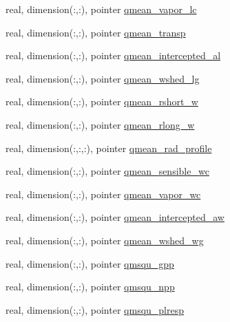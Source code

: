 \begin{DoxyCompactItemize}
\item 
real, dimension(\+:,\+:), pointer \hyperlink{structed__state__vars_1_1patchtype_aed7445225a77f628c746cac281507a53}{qmean\+\_\+vapor\+\_\+lc}
\item 
real, dimension(\+:,\+:), pointer \hyperlink{structed__state__vars_1_1patchtype_a08105f234acc20638a4196fe72eb3c0b}{qmean\+\_\+transp}
\item 
real, dimension(\+:,\+:), pointer \hyperlink{structed__state__vars_1_1patchtype_a09f85fa1f73e11a63f83bfb52613053a}{qmean\+\_\+intercepted\+\_\+al}
\item 
real, dimension(\+:,\+:), pointer \hyperlink{structed__state__vars_1_1patchtype_ae1c9098bcb22f10a5fce878ab55a1cf3}{qmean\+\_\+wshed\+\_\+lg}
\item 
real, dimension(\+:,\+:), pointer \hyperlink{structed__state__vars_1_1patchtype_aa44a19c9e383a58d002113eb433fd1ae}{qmean\+\_\+rshort\+\_\+w}
\item 
real, dimension(\+:,\+:), pointer \hyperlink{structed__state__vars_1_1patchtype_a10bc9e3763e29019eb291f2f2cf508dd}{qmean\+\_\+rlong\+\_\+w}
\item 
real, dimension(\+:,\+:,\+:), pointer \hyperlink{structed__state__vars_1_1patchtype_a813b69b555801d99b6e7301d997589f4}{qmean\+\_\+rad\+\_\+profile}
\item 
real, dimension(\+:,\+:), pointer \hyperlink{structed__state__vars_1_1patchtype_aa43a35ed2d968d3f325b9bc66dafb7b3}{qmean\+\_\+sensible\+\_\+wc}
\item 
real, dimension(\+:,\+:), pointer \hyperlink{structed__state__vars_1_1patchtype_a88624e5b5214d970b07c8bcbe15ac7e6}{qmean\+\_\+vapor\+\_\+wc}
\item 
real, dimension(\+:,\+:), pointer \hyperlink{structed__state__vars_1_1patchtype_aaf30eb5f3c6f6e40550f515bd9bc1f19}{qmean\+\_\+intercepted\+\_\+aw}
\item 
real, dimension(\+:,\+:), pointer \hyperlink{structed__state__vars_1_1patchtype_ad152cf377bbfd96af019c0e71a79f97a}{qmean\+\_\+wshed\+\_\+wg}
\item 
real, dimension(\+:,\+:), pointer \hyperlink{structed__state__vars_1_1patchtype_a0f45aab0f1cc4f750a92c8c4a470ae6a}{qmsqu\+\_\+gpp}
\item 
real, dimension(\+:,\+:), pointer \hyperlink{structed__state__vars_1_1patchtype_a351ffb065e425ce16c87fde635217532}{qmsqu\+\_\+npp}
\item 
real, dimension(\+:,\+:), pointer \hyperlink{structed__state__vars_1_1patchtype_aadc08badc00cc983fb3127f2ffa0aaf6}{qmsqu\+\_\+plresp}

\end{DoxyCompactItemize}
